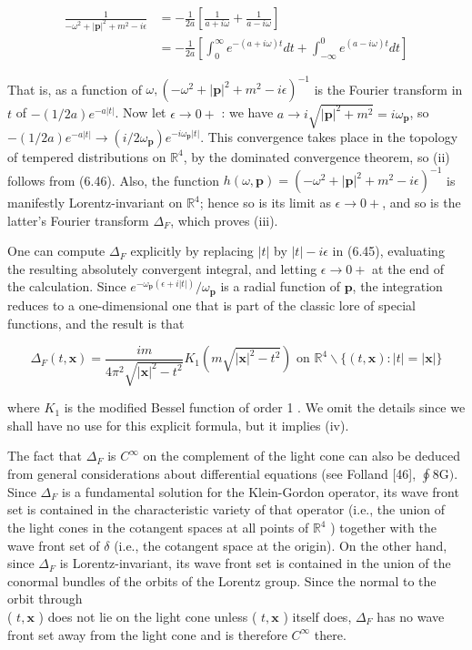 \documentclass[10pt, letterpaper]{article}
\begin{document}
$$
\begin{aligned}
\frac{1}{-\omega^{2}+|\mathbf{p}|^{2}+m^{2}-i \epsilon} & =-\frac{1}{2 a}\left[\frac{1}{a+i \omega}+\frac{1}{a-i \omega}\right] \\
& =-\frac{1}{2 a}\left[\int_{0}^{\infty} e^{-(a+i \omega) t} d t+\int_{-\infty}^{0} e^{(a-i \omega) t} d t\right]
\end{aligned}
$$

That is, as a function of $\omega,\left(-\omega^{2}+|\mathbf{p}|^{2}+m^{2}-i \epsilon\right)^{-1}$ is the Fourier transform in $t$ of $-(1 / 2 a) e^{-a|t|}$. Now let $\epsilon \rightarrow 0+$ : we have $a \rightarrow i \sqrt{|\mathbf{p}|^{2}+m^{2}}=i \omega_{\mathbf{p}}$, so $-(1 / 2 a) e^{-a|t|} \rightarrow\left(i / 2 \omega_{\mathbf{p}}\right) e^{-i \omega_{\mathbf{p}}|t|}$. This convergence takes place in the topology of tempered distributions on $\mathbb{R}^{4}$, by the dominated convergence theorem, so (ii) follows from (6.46). Also, the function $h(\omega, \mathbf{p})=\left(-\omega^{2}+|\mathbf{p}|^{2}+m^{2}-i \epsilon\right)^{-1}$ is manifestly Lorentz-invariant on $\mathbb{R}^{4}$; hence so is its limit as $\epsilon \rightarrow 0+$, and so is the latter's Fourier transform $\Delta_{F}$, which proves (iii).

One can compute $\Delta_{F}$ explicitly by replacing $|t|$ by $|t|-i \epsilon$ in (6.45), evaluating the resulting absolutely convergent integral, and letting $\epsilon \rightarrow 0+$ at the end of the calculation. Since $e^{-\omega_{\mathbf{p}}(\epsilon+i|t|)} / \omega_{\mathbf{p}}$ is a radial function of $\mathbf{p}$, the integration reduces to a one-dimensional one that is part of the classic lore of special functions, and the result is that

$$
\Delta_{F}(t, \mathbf{x})=\frac{i m}{4 \pi^{2} \sqrt{|\mathbf{x}|^{2}-t^{2}}} K_{1}\left(m \sqrt{|\mathbf{x}|^{2}-t^{2}}\right) \text { on } \mathbb{R}^{4} \backslash\{(t, \mathbf{x}):|t|=|\mathbf{x}|\}
$$

where $K_{1}$ is the modified Bessel function of order 1 . We omit the details since we shall have no use for this explicit formula, but it implies (iv).

The fact that $\Delta_{F}$ is $C^{\infty}$ on the complement of the light cone can also be deduced from general considerations about differential equations (see Folland [46], $\oint 8 \mathrm{G})$. Since $\Delta_{F}$ is a fundamental solution for the Klein-Gordon operator, its wave front set is contained in the characteristic variety of that operator (i.e., the union of the light cones in the cotangent spaces at all points of $\mathbb{R}^{4}$ ) together with the wave front set of $\delta$ (i.e., the cotangent space at the origin). On the other hand, since $\Delta_{F}$ is Lorentz-invariant, its wave front set is contained in the union of the conormal bundles of the orbits of the Lorentz group. Since the normal to the orbit through\\
( $t, \mathbf{x}$ ) does not lie on the light cone unless ( $t, \mathbf{x}$ ) itself does, $\Delta_{F}$ has no wave front set away from the light cone and is therefore $C^{\infty}$ there.
\end{document}
